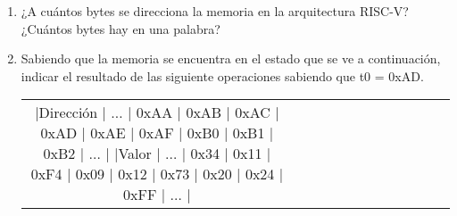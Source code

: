 \begin{enunciado}{\ejercicio}
    \begin{enunciado}{\ejercicio}
        \begin{enumerate}
            \item ¿A cuántos bytes se direcciona la memoria en la arquitectura RISC-V? ¿Cuántos bytes
            hay en una palabra?
            \item Sabiendo que la memoria se encuentra en el estado que se ve a continuación, indicar el
            resultado de las siguiente operaciones sabiendo que t0 = 0xAD.
            
            \begin{center}
            \begin{tabular}{ |c|c|c|c|c|c|c|c|c|c|c|c|} 
                |Dirección | $\dots$ | 0xAA | 0xAB | 0xAC | 0xAD | 0xAE | 0xAF | 0xB0 | 0xB1 | 0xB2 | $\dots$ |
                |Valor     | $\dots$ | 0x34 | 0x11 | 0xF4 | 0x09 | 0x12 | 0x73 | 0x20 | 0x24 | 0xFF | $\dots$ |
            \end{tabular}
            \end{center}
        \end{enumerate}
        \end{enunciado}
         
    \end{enunciado}
    